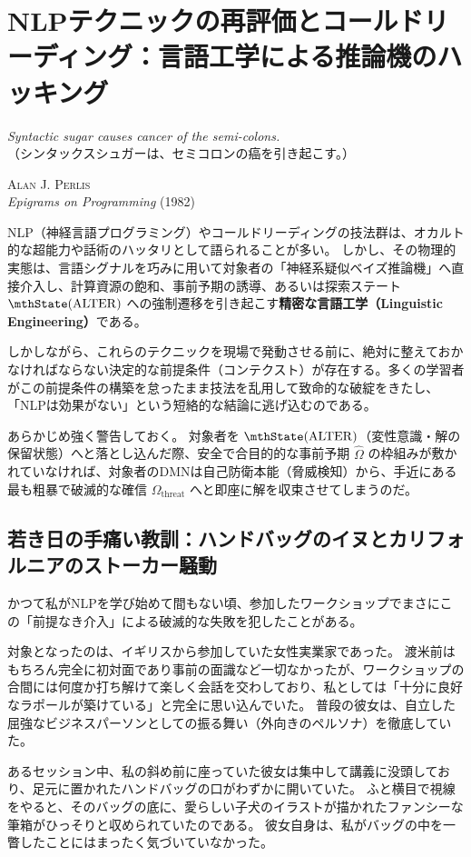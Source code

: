 \chapter{NLPテクニックの再評価とコールドリーディング：言語工学による推論機のハッキング}
\epigraph{%
  \textit{Syntactic sugar causes cancer of the semi-colons.}\\
  \vspace{2pt}
  \footnotesize （シンタックスシュガーは、セミコロンの癌を引き起こす。）
}{%
  \textsc{Alan J. Perlis}\\
  \footnotesize \textit{Epigrams on Programming} (1982)
}
NLP（神経言語プログラミング）やコールドリーディングの技法群は、オカルト的な超能力や話術のハッタリとして語られることが多い。
しかし、その物理的実態は、言語シグナルを巧みに用いて対象者の「神経系疑似ベイズ推論機」へ直接介入し、計算資源の飽和、事前予期の誘導、あるいは探索ステート $\mthState(\mathrm{ALTER})$ への強制遷移を引き起こす\textbf{精密な言語工学（Linguistic Engineering）}である。

しかしながら、これらのテクニックを現場で発動させる前に、絶対に整えておかなければならない決定的な前提条件（コンテクスト）が存在する。多くの学習者がこの前提条件の構築を怠ったまま技法を乱用して致命的な破綻をきたし、「NLPは効果がない」という短絡的な結論に逃げ込むのである。

あらかじめ強く警告しておく。
対象者を $\mthState(\mathrm{ALTER})$（変性意識・解の保留状態）へと落とし込んだ際、安全で合目的的な事前予期 $\hat{\Omega}$ の枠組みが敷かれていなければ、対象者のDMNは自己防衛本能（脅威検知）から、手近にある最も粗暴で破滅的な確信 $\Omega_{\mathrm{threat}}$ へと即座に解を収束させてしまうのだ。

\section{若き日の手痛い教訓：ハンドバッグのイヌとカリフォルニアのストーカー騒動}

かつて私がNLPを学び始めて間もない頃、参加したワークショップでまさにこの「前提なき介入」による破滅的な失敗を犯したことがある。

対象となったのは、イギリスから参加していた女性実業家であった。
渡米前はもちろん完全に初対面であり事前の面識など一切なかったが、ワークショップの合間には何度か打ち解けて楽しく会話を交わしており、私としては「十分に良好なラポールが築けている」と完全に思い込んでいた。
普段の彼女は、自立した屈強なビジネスパーソンとしての振る舞い（外向きのペルソナ）を徹底していた。

あるセッション中、私の斜め前に座っていた彼女は集中して講義に没頭しており、足元に置かれたハンドバッグの口がわずかに開いていた。
ふと横目で視線をやると、そのバッグの底に、愛らしい子犬のイラストが描かれたファンシーな筆箱がひっそりと収められていたのである。
彼女自身は、私がバッグの中を一瞥したことにはまったく気づいていなかった。

